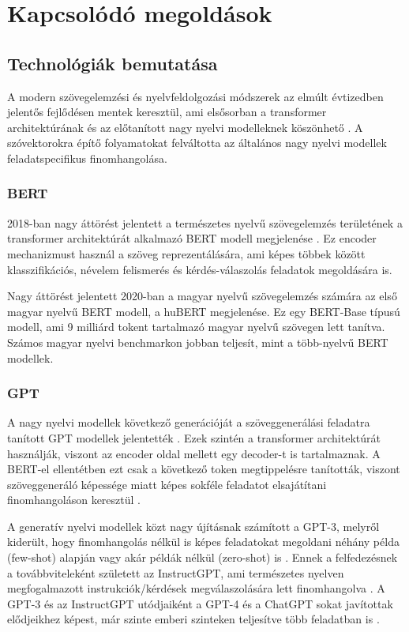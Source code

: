 \chapter{Kapcsolódó megoldások}

\section{Technológiák bemutatása}

A modern szövegelemzési és nyelvfeldolgozási módszerek az elmúlt évtizedben jelentős fejlődésen mentek keresztül, ami elsősorban a transformer architektúrának és az előtanított nagy nyelvi modelleknek köszönhető \cite{transformer}. A szóvektorokra építő folyamatokat felváltotta az általános nagy nyelvi modellek feladatspecifikus finomhangolása.

\subsection{BERT}

2018-ban nagy áttörést jelentett a természetes nyelvű szövegelemzés területének a transformer architektúrát alkalmazó BERT modell megjelenése \cite{bert}. Ez encoder mechanizmust használ a szöveg reprezentálására, ami képes többek között klasszifikációs, névelem felismerés és kérdés-válaszolás feladatok megoldására is.

Nagy áttörést jelentett 2020-ban a magyar nyelvű szövegelemzés számára az első magyar nyelvű BERT modell, a huBERT \cite{Nemeskey:2021a} megjelenése. Ez egy BERT-Base típusú modell, ami 9 milliárd tokent tartalmazó magyar nyelvű szövegen lett tanítva. Számos magyar nyelvi benchmarkon jobban teljesít, mint a több-nyelvű BERT modellek.

\subsection{GPT}

A nagy nyelvi modellek következő generációját a szöveggenerálási feladatra tanított GPT modellek jelentették \cite{gpt1}. Ezek szintén a transformer architektúrát használják, viszont az encoder oldal mellett egy decoder-t is tartalmaznak. A BERT-el ellentétben ezt csak a következő token megtippelésre tanították, viszont szöveggeneráló képessége miatt képes sokféle feladatot elsajátítani finomhangoláson keresztül \cite{gpt2}.

A generatív nyelvi modellek közt nagy újításnak számított a GPT-3, melyről kiderült, hogy finomhangolás nélkül is képes feladatokat megoldani néhány példa (few-shot) alapján vagy akár példák nélkül (zero-shot) is \cite{gpt3}. Ennek a felfedezésnek a továbbviteleként született az InstructGPT, ami természetes nyelven megfogalmazott instrukciók/kérdések megválaszolására lett finomhangolva \cite{instructgpt}. A GPT-3 és az InstructGPT utódjaiként a GPT-4 és a ChatGPT sokat javítottak elődjeikhez képest, már szinte emberi szinteken teljesítve több feladatban is \cite{gpt4}.

